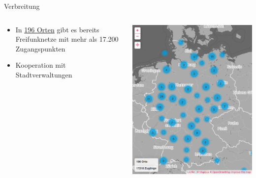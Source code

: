 \documentclass[t]{beamer}
\begin{document}
\begin{frame}{Verbreitung}
	\begin{columns}
		\begin{column}{0.6\textwidth}
			\begin{itemize}
				\item In  \href{http://freifunk.net/wie-mache-ich-mit/community-finden/}{196 Orten} gibt es bereits Freifunknetze mit mehr als 17.200 Zugangspunkten
				\item Kooperation mit Stadtverwaltungen
			\end{itemize}
		\end{column}
		\begin{column}{0.4\textwidth}
			\begin{center}
				\includegraphics[width=\textwidth]{Bilder/community-map-2015-08-13}
			\end{center}
		\end{column}
	\end{columns}
\end{frame}
\end{document}
